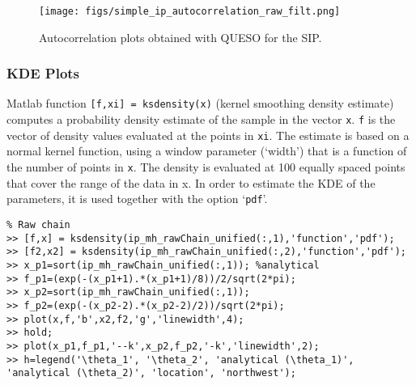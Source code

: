 \begin{figure}[htpb]
\centering
\texttt{[image: figs/simple\_ip\_autocorrelation\_raw\_filt.png]}
\vspace{-10pt}
\caption{
Autocorrelation plots obtained with QUESO for the SIP. }
\label{fig:simple_sip_autocorrelation_raw_filt}
\end{figure}


\subsubsection{KDE Plots}

Matlab function \verb+[f,xi] = ksdensity(x)+ (kernel smoothing density estimate) computes a probability density estimate of the sample in the vector \texttt{x}. \texttt{f} is the vector of density values evaluated at the points in \texttt{xi}. The estimate is based on a normal kernel function, using a window parameter (`width') that is a function of the number of points in \texttt{x}. The density is evaluated at 100 equally spaced points that cover the range of the data in x.  In order to estimate the KDE of the parameters, it is used together with the option `\verb+pdf+'. 

\begin{lstlisting}[label=matlab:ip_kde,caption={Matlab code for the KDE plots displayed in the left of Figure \ref{fig:simple_sip_kde}.}]
% Inside Matlab
% Raw chain
>> [f,x] = ksdensity(ip_mh_rawChain_unified(:,1),'function','pdf');
>> [f2,x2] = ksdensity(ip_mh_rawChain_unified(:,2),'function','pdf');
>> x_p1=sort(ip_mh_rawChain_unified(:,1)); %analytical
>> f_p1=(exp(-(x_p1+1).*(x_p1+1)/8))/2/sqrt(2*pi);
>> x_p2=sort(ip_mh_rawChain_unified(:,1));
>> f_p2=(exp(-(x_p2-2).*(x_p2-2)/2))/sqrt(2*pi);
>> plot(x,f,'b',x2,f2,'g','linewidth',4);
>> hold;
>> plot(x_p1,f_p1,'--k',x_p2,f_p2,'-k','linewidth',2);
>> h=legend('\theta_1', '\theta_2', 'analytical (\theta_1)', 'analytical (\theta_2)', 'location', 'northwest');
\end{lstlisting}

